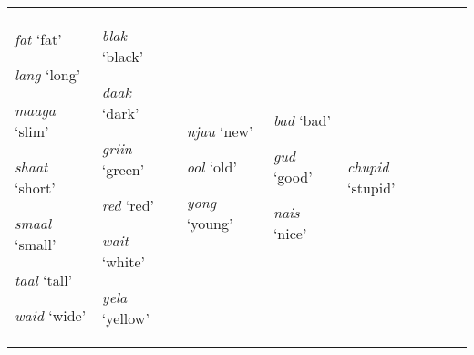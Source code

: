 \begin{table}
{\begin{tabular}{p{2.7cm}p{2cm}p{2cm}p{1.7cm}p{1.7cm}p{2.7cm}p{2cm}}
                                      \textit{fat} `fat'

                                      \textit{lang} `long'

                                      \textit{maaga} `slim'

                                      \textit{shaat} `short'

                                      \textit{smaal} `small'

                                      \textit{taal} `tall'

                                      \textit{waid} `wide'

                                                            &
 
                                                              \textit{blak} `black’

                                                              \textit{daak} `dark’

                                                              \textit{griin} `green’

                                                              \textit{red} `red'

                                                              \textit{wait} `white'

                                                              \textit{yela} `yellow' 
                                                                                & 

                                                                                  \textit{njuu} `new'

                                                                                  \textit{ool} `old'

                                                                                  \textit{yong} `young'

                                                                                                  &
                                                                                                    \textit{bad} `bad'

                                                                                                    \textit{gud} `good'

                                                                                                    \textit{nais} `nice'
                                                                                                                      &
                                                                                                                        \textit{chupid} `stupid'


\end{tabular}}
\end{table}
